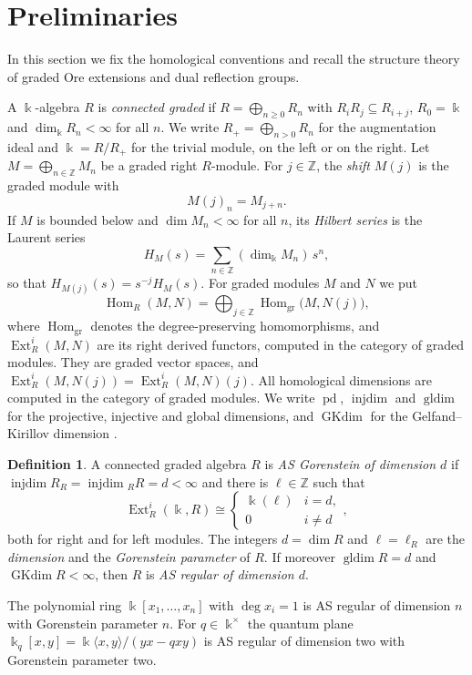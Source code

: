 \documentclass[reqno]{amsart}
\numberwithin{equation}{section}
\theoremstyle{definition}
\newtheorem{definition}[equation]{Definition}
\theoremstyle{remark}
\theoremstyle{plain}
\newcommand{\kk}{\Bbbk}
\DeclareMathOperator{\Ext}{Ext}
\DeclareMathOperator{\Hom}{Hom}
\DeclareMathOperator{\pd}{pd}
\DeclareMathOperator{\injdim}{injdim}
\DeclareMathOperator{\gldim}{gldim}
\DeclareMathOperator{\GKdim}{GKdim}
\begin{document}
\section{Preliminaries}\label{YAMs1Pr0}

In this section we fix the homological conventions and recall the structure theory of graded Ore extensions and dual reflection groups.

A $\kk$-algebra $R$ is \emph{connected graded} if $R=\bigoplus_{n\ge0}R_n$ with $R_iR_j\subseteq R_{i+j}$, $R_0=\kk$ and $\dim_\kk R_n<\infty$ for all $n$. We write $R_+=\bigoplus_{n>0}R_n$ for the augmentation ideal and $\kk=R/R_+$ for the trivial module, on the left or on the right. Let $M=\bigoplus_{n\in\mathbb Z}M_n$ be a graded right $R$-module. For $j\in\mathbb Z$, the \emph{shift} $M(j)$ is the graded module with
\[
M(j)_n=M_{j+n}.
\]
If $M$ is bounded below and $\dim M_n<\infty$ for all $n$, its \emph{Hilbert series} is the Laurent series
\[
H_M(s)=\sum_{n\in\mathbb Z}(\dim_\kk M_n)\,s^n,
\]
so that $H_{M(j)}(s)=s^{-j}H_M(s)$. For graded modules $M$ and $N$ we put
\[
\Hom_R(M,N)=\bigoplus_{j\in\mathbb Z}\Hom_{\mathrm{gr}}\big(M,N(j)\big),
\]
where $\Hom_{\mathrm{gr}}$ denotes the degree-preserving homomorphisms, and $\Ext^i_R(M,N)$ are its right derived functors, computed in the category of graded modules. They are graded vector spaces, and $\Ext^i_R(M,N(j))=\Ext^i_R(M,N)(j)$. All homological dimensions are computed in the category of graded modules. We write $\pd$, $\injdim$ and $\gldim$ for the projective, injective and global dimensions, and $\GKdim$ for the Gelfand--Kirillov dimension \cite[Chapter 8]{MR}.

\begin{definition}\label{YAMd2As2}
A connected graded algebra $R$ is \emph{AS Gorenstein of dimension $d$} if $\injdim R_R=\injdim{}_RR=d<\infty$ and there is $\ell\in\mathbb Z$ such that
\[
\Ext^i_R(\kk,R)\cong\begin{cases}\kk(\ell)&i=d,\\0&i\neq d\end{cases},
\]
both for right and for left modules. The integers $d=\dim R$ and $\ell=\ell_R$ are the \emph{dimension} and the \emph{Gorenstein parameter} of $R$. If moreover $\gldim R=d$ and $\GKdim R<\infty$, then $R$ is \emph{AS regular of dimension $d$}.
\end{definition}

The polynomial ring $\kk[x_1,\dots,x_n]$ with $\deg x_i=1$ is AS regular of dimension $n$ with Gorenstein parameter $n$. For $q\in\kk^\times$ the quantum plane $\kk_q[x,y]=\kk\langle x,y\rangle/(yx-qxy)$ is AS regular of dimension two with Gorenstein parameter two.
\end{document}
